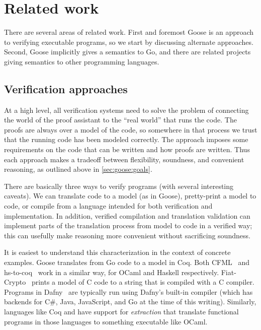 \section{Related work}%
\label{s:goose:rel-work}

There are several areas of related work. First and foremost Goose is an approach
to verifying executable programs, so we start by discussing alternate
approaches. Second, Goose implicitly gives a semantics to Go, and there are
related projects giving semantics to other programming languages.

\subsection{Verification approaches}

At a high level, all verification systems need to solve the problem of
connecting the world of the proof assistant to the ``real world'' that runs the
code. The proofs are always over a model of the code, so somewhere in that
process we trust that the running code has been modeled correctly. The approach
imposes some requirements on the code that can be written and how proofs are
written. Thus each approach makes a tradeoff between flexibility, soundness, and
convenient reasoning, as outlined above in \cref{sec:goose:goals}.

There are basically three ways to verify programs (with several interesting
caveats). We can translate code to a model (as in Goose), pretty-print a
model to code, or compile from a language intended for both verification and
implementation. In addition, verified compilation and translation validation can
implement parts of the translation process from model to code in a verified way;
this can usefully make reasoning more convenient without sacrificing soundness.

It is easiest to understand this characterization in the context of concrete
examples. Goose translates from Go code to a model in Coq. Both
CFML~\cite{chargueraud:cfml} and hs-to-coq~\cite{spector-zabusky:hstocoq} work
in a similar way, for OCaml and Haskell respectively.
Fiat-Crypto~\cite{erbsen:fiat-crypto} prints a model of C code to a string that
is compiled with a C compiler. Programs in Dafny~\cite{leino:dafny} are
typically run using Dafny's built-in compiler (which has backends for C\#, Java,
JavaScript, and Go at the time of this writing). Similarly, languages like Coq
and \fstar have support for \emph{extraction} that translate functional programs
in those languages to something executable like OCaml.

